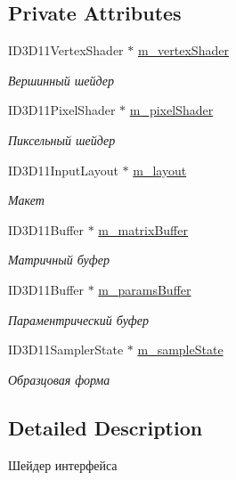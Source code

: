 \subsection*{Private Attributes}
\begin{DoxyCompactItemize}
\item 
I\+D3\+D11\+Vertex\+Shader $\ast$ \hyperlink{class_interface_shader_class_a849024b541179aaacad13c279840ea98}{m\+\_\+vertex\+Shader}
\begin{DoxyCompactList}\small\item\em Вершинный шейдер \end{DoxyCompactList}\item 
I\+D3\+D11\+Pixel\+Shader $\ast$ \hyperlink{class_interface_shader_class_ae51566ac1872f3dc0991985414836c8a}{m\+\_\+pixel\+Shader}
\begin{DoxyCompactList}\small\item\em Пиксельный шейдер \end{DoxyCompactList}\item 
I\+D3\+D11\+Input\+Layout $\ast$ \hyperlink{class_interface_shader_class_ab03491418028cd8e75511c67477645b8}{m\+\_\+layout}
\begin{DoxyCompactList}\small\item\em Макет \end{DoxyCompactList}\item 
I\+D3\+D11\+Buffer $\ast$ \hyperlink{class_interface_shader_class_afb722713945847ac207821fb377d3340}{m\+\_\+matrix\+Buffer}
\begin{DoxyCompactList}\small\item\em Матричный буфер \end{DoxyCompactList}\item 
I\+D3\+D11\+Buffer $\ast$ \hyperlink{class_interface_shader_class_a4f83462680b27ec8aa3eac216604cc6c}{m\+\_\+params\+Buffer}
\begin{DoxyCompactList}\small\item\em Параментрический буфер \end{DoxyCompactList}\item 
I\+D3\+D11\+Sampler\+State $\ast$ \hyperlink{class_interface_shader_class_af0bcbf802db0c746b47a92c95b9d9a33}{m\+\_\+sample\+State}
\begin{DoxyCompactList}\small\item\em Образцовая форма \end{DoxyCompactList}\end{DoxyCompactItemize}


\subsection{Detailed Description}
Шейдер интерфейса 

